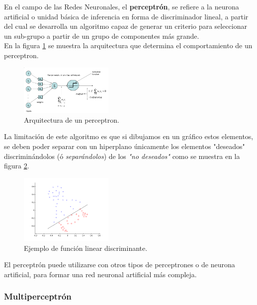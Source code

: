 \documentclass[osajnl,twocolumn,showpacs,superscriptaddress,10pt,floatfix]{revtex4-1} %
\begin{document}
En el campo de las Redes Neuronales, el \textbf{perceptrón}, se refiere a la neurona artificial o unidad básica de inferencia en forma de discriminador lineal, a partir del cual se desarrolla un algoritmo capaz de generar un criterio para seleccionar un sub-grupo a partir de un grupo de componentes más grande. \\

En la figura \ref{figure:perceptron_example} se muestra la arquitectura que determina el comportamiento de un perceptron.

\begin{figure}[H]
    \centering
    \includegraphics[width=0.4\textwidth]{theory/perceptron}
    \caption{Arquitectura de un perceptron.}
    \label{figure:perceptron_example}
\end{figure}

La limitación de este algoritmo es que si dibujamos en un gráfico estos elementos, se deben poder separar con un hiperplano únicamente los elementos "deseados" discriminándolos (ó \textit{separándolos}) de los \textit{"no deseados"} como se muestra en la figura \ref{figure:linear_example}.

\begin{figure}[H]
    \centering
    \includegraphics[width=0.4\textwidth]{theory/linear}
    \caption{Ejemplo de función linear discriminante.}
    \label{figure:linear_example}
\end{figure}

El perceptrón puede utilizarse con otros tipos de perceptrones o de neurona artificial, para formar una red neuronal artificial más compleja.

\subsubsection{Multiperceptrón}
\end{document}
